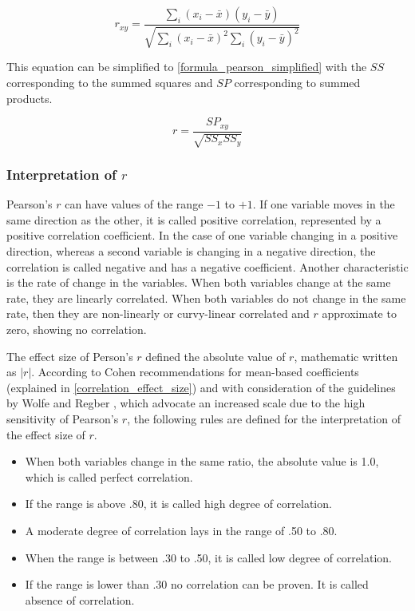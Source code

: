 \smallskip

\begin{equation}
\label{formula_pearson}	
	r_{xy} =  \frac{\sum_{i}{(x_i-\bar{x})(y_i-\bar{y})}}{\sqrt{\sum_{i}{(x_i-\bar{x})^2}\sum_{i}{(y_i-\bar{y})^2}}}
\end{equation}

\bigskip

This equation can be simplified to \cref{formula_pearson_simplified} with the $SS$ corresponding to the summed squares and $SP$ corresponding to summed products.

\smallskip

\begin{equation}
\label{formula_pearson_simplified}
	r =  \frac{SP_{xy}}{\sqrt{SS_x SS_y}}
\end{equation}

\subsubsection{Interpretation of $r$}
Pearson's $r$ can have values of the range $-1$ to $+1$. If one variable moves in the same direction as the other, it is called positive correlation, represented by a positive correlation coefficient. In the case of one variable changing in a positive direction, whereas a second variable is changing in a negative direction, the correlation is called negative and has a negative coefficient. Another characteristic is the rate of change in the variables. When both variables change at the same rate, they are linearly correlated. When both variables do not change in the same rate, then they are non-linearly or curvy-linear correlated and $r$ approximate to zero, showing no correlation.

The effect size of Person's $r$ defined the absolute value of $r$, mathematic written as $|r|$. According to Cohen recommendations for mean-based coefficients (explained in \cref{correlation_effect_size}) and with consideration of the guidelines by Wolfe \parencite{Wolfe2017} and Regber \parencite{Regber2016}, which advocate an increased scale due to the high sensitivity of Pearson's $r$, the following rules are defined for the interpretation of the effect size of $r$.

\begin{itemize}
  \item When both variables change in the same ratio, the absolute value is 1.0, which is called perfect correlation.
  \item If the range is above .80, it is called high degree of correlation.
  \item A moderate degree of correlation lays in the range of .50 to .80.
  \item When the range is between .30 to .50, it is called low degree of correlation.
  \item If the range is lower than .30 no correlation can be proven. It is called absence of correlation.
\end{itemize}

